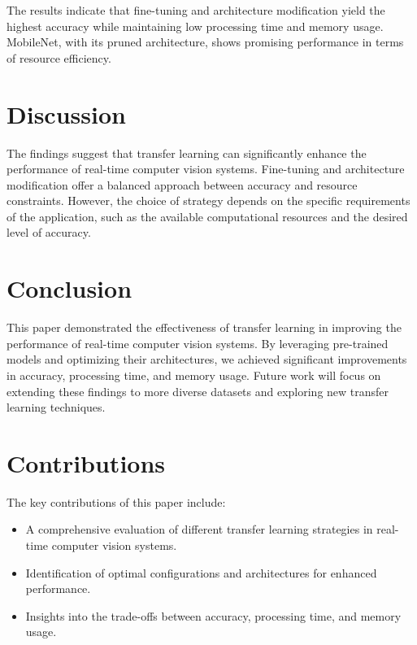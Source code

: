 \documentclass{article}
\begin{document}
The results indicate that fine-tuning and architecture modification yield the highest accuracy while maintaining low processing time and memory usage. MobileNet, with its pruned architecture, shows promising performance in terms of resource efficiency.

\section{Discussion}
\label{sec:discussion}
The findings suggest that transfer learning can significantly enhance the performance of real-time computer vision systems. Fine-tuning and architecture modification offer a balanced approach between accuracy and resource constraints. However, the choice of strategy depends on the specific requirements of the application, such as the available computational resources and the desired level of accuracy.

\section{Conclusion}
\label{sec:conclusion}
This paper demonstrated the effectiveness of transfer learning in improving the performance of real-time computer vision systems. By leveraging pre-trained models and optimizing their architectures, we achieved significant improvements in accuracy, processing time, and memory usage. Future work will focus on extending these findings to more diverse datasets and exploring new transfer learning techniques.

\section{Contributions}
\label{sec:contributions}
The key contributions of this paper include:
\begin{itemize}
    \item A comprehensive evaluation of different transfer learning strategies in real-time computer vision systems.
    \item Identification of optimal configurations and architectures for enhanced performance.
    \item Insights into the trade-offs between accuracy, processing time, and memory usage.
\end{itemize}



\end{document}
